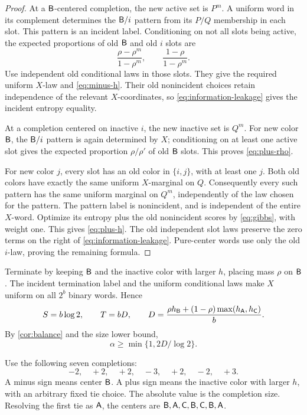 \begin{proof}
At a \(\mathsf B\)-centered completion, the new active set is \(P^m\).
A uniform word in its complement determines the \(\mathsf B/i\) pattern
from its \(P/Q\) membership in each slot.
This pattern is an incident label.
Conditioning on not all slots being active, the expected proportions
of old \(\mathsf B\) and old \(i\) slots are
\[
 \frac{\rho-\rho^m}{1-\rho^m},
 \qquad \frac{1-\rho}{1-\rho^m}.
\]
Use independent old conditional laws in those slots.
They give the required uniform \(X\)-law and
\eqref{eq:minus-h}.
Their old nonincident choices retain independence of the relevant
\(X\)-coordinates, so \eqref{eq:information-leakage} gives the incident
entropy equality.

At a completion centered on inactive \(i\), the new inactive set is
\(Q^m\).  For new color \(\mathsf B\), the \(\mathsf B/i\) pattern is again
determined by \(X\); conditioning on at least one active slot gives
the expected proportion \(\rho/\rho'\) of old \(\mathsf B\) slots.
This proves \eqref{eq:plus-rho}.

For new color \(j\), every slot has an old color in \(\{i,j\}\), with
at least one \(j\).
Both old colors have exactly the same uniform \(X\)-marginal on \(Q\).
Consequently every such pattern has the same uniform marginal on
\(Q^m\), independently of the law chosen for the pattern.
The pattern label is nonincident, and is independent of the entire
\(X\)-word.
Optimize its entropy plus the old nonincident scores by
\eqref{eq:gibbs}, with weight one.
This gives \eqref{eq:plus-h}.
The old independent slot laws preserve the zero terms on the right
of \eqref{eq:information-leakage}.
Pure-center words use only the old \(i\)-law, proving the remaining
formula.
\end{proof}

Terminate by keeping \(\mathsf B\) and the inactive color with larger \(h\),
placing mass \(\rho\) on \(\mathsf B\).
The incident termination label and the uniform conditional laws make
\(X\) uniform on all \(2^b\) binary words.
Hence
\begin{equation}\label{eq:flat-rates}
 S=b\log2,\qquad
 T=bD,\qquad
 D=\frac{\rho h_{\mathsf B}+(1-\rho)\max(h_{\mathsf A},h_{\mathsf C})}{b}.
\end{equation}
By \cref{cor:balance} and the size lower bound,
\begin{equation}\label{eq:alpha-certificate}
 \alpha\ge \min\{1,2D/\log2\}.
\end{equation}

Use the following seven completions:
\begin{equation}\label{eq:dual-script}
 -2,\quad +2,\quad +2,\quad -3,\quad +2,\quad -2,\quad +3.
\end{equation}
A minus sign means center \(\mathsf B\).
A plus sign means the inactive color with larger \(h\), with an
arbitrary fixed tie choice.
The absolute value is the completion size.
Resolving the first tie as \(\mathsf A\), the centers are
\(\mathsf B,\mathsf A,\mathsf C,\mathsf B,\mathsf C,\mathsf B,\mathsf A\).

